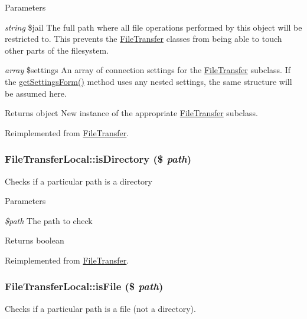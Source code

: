 \begin{DoxyParams}{Parameters}
\item[{\em string}]\$jail The full path where all file operations performed by this object will be restricted to. This prevents the \hyperlink{classFileTransfer}{FileTransfer} classes from being able to touch other parts of the filesystem. \item[{\em array}]\$settings An array of connection settings for the \hyperlink{classFileTransfer}{FileTransfer} subclass. If the \hyperlink{classFileTransfer_a3b5e843b16814bdbe43dfecda17bae33}{getSettingsForm()} method uses any nested settings, the same structure will be assumed here. \end{DoxyParams}
\begin{DoxyReturn}{Returns}
object New instance of the appropriate \hyperlink{classFileTransfer}{FileTransfer} subclass. 
\end{DoxyReturn}


Reimplemented from \hyperlink{classFileTransfer_aed740d2f6e0780134b2b29a174ad05f2}{FileTransfer}.\hypertarget{classFileTransferLocal_ae17e18a84f3edd9337b3c1ca9dcbd3cf}{
\subsubsection[{isDirectory}]{\setlength{\rightskip}{0pt plus 5cm}FileTransferLocal::isDirectory (\$ {\em path})}}
\label{classFileTransferLocal_ae17e18a84f3edd9337b3c1ca9dcbd3cf}
Checks if a particular path is a directory


\begin{DoxyParams}{Parameters}
\item[{\em \$path}]The path to check\end{DoxyParams}
\begin{DoxyReturn}{Returns}
boolean 
\end{DoxyReturn}


Reimplemented from \hyperlink{classFileTransfer_a86c4289cfeccacf9bd2bcae8961889ab}{FileTransfer}.\hypertarget{classFileTransferLocal_a6421f45b2570ef9591aae36b1f3ea72e}{
\subsubsection[{isFile}]{\setlength{\rightskip}{0pt plus 5cm}FileTransferLocal::isFile (\$ {\em path})}}
\label{classFileTransferLocal_a6421f45b2570ef9591aae36b1f3ea72e}
Checks if a particular path is a file (not a directory).


